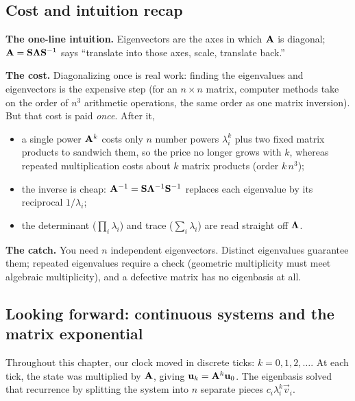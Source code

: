 \subsection{Cost and intuition recap}
\label{ch24:recap}

\begin{recoverybox}
\textbf{The one-line intuition.} Eigenvectors are the axes in which $\mathbf{A}$ is
diagonal; $\mathbf{A} = \mathbf{S}\mathbf{\Lambda}\mathbf{S}^{-1}$ says ``translate into those
axes, scale, translate back.''

\textbf{The cost.} Diagonalizing once is real work: finding the eigenvalues and
eigenvectors is the expensive step (for an $n\times n$ matrix, computer methods
take on the order of $n^3$ arithmetic operations, the same order as one matrix
inversion). But that cost is paid \emph{once}. After it,
\begin{itemize}
  \item a single power $\mathbf{A}^k$ costs only $n$ number powers $\lambda_i^k$ plus
        two fixed matrix products to sandwich them, so the price no longer grows
        with $k$, whereas repeated multiplication costs about $k$ matrix
        products (order $k\,n^3$);
  \item the inverse is cheap: $\mathbf{A}^{-1} =
        \mathbf{S}\mathbf{\Lambda}^{-1}\mathbf{S}^{-1}$ replaces each eigenvalue by its
        reciprocal $1/\lambda_i$;
  \item the determinant ($\prod_i\lambda_i$) and trace ($\sum_i\lambda_i$) are
        read straight off $\mathbf{\Lambda}$.
\end{itemize}

\textbf{The catch.} You need $n$ independent eigenvectors. Distinct eigenvalues
guarantee them; repeated eigenvalues require a check (geometric multiplicity must
meet algebraic multiplicity), and a defective matrix has no eigenbasis at all.
\end{recoverybox}

\subsection{Looking forward: continuous systems and the matrix exponential}
\label{ch24:looking-forward}

Throughout this chapter, our clock moved in discrete ticks: $k = 0, 1, 2, \dots$.
At each tick, the state was multiplied by $\mathbf{A}$, giving $\mathbf{u}_k = \mathbf{A}^k\mathbf{u}_0$.
The eigenbasis solved that recurrence by splitting the system into $n$ separate
pieces $c_i \lambda_i^k\vec{v}_i$.

